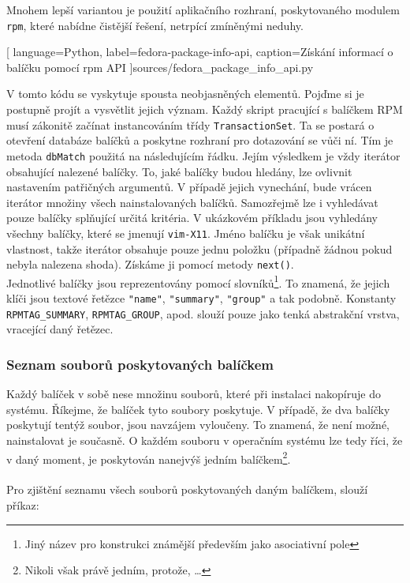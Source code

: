 \documentclass[
  field=inf,
  biblatex,
  glossaries,
  index
]{kidiplom}
\begin{document}
		Mnohem lepší variantou je použití aplikačního rozhraní, poskytovaného modulem \texttt{rpm}, které nabídne čistější řešení, netrpící zmíněnými neduhy.

		
		[
			language=Python,
			label=fedora-package-info-api,
			caption={Získání informací o balíčku pomocí rpm API}
		]{sources/fedora_package_info_api.py}

		V tomto kódu se vyskytuje spousta neobjasněných elementů. Pojďme si je postupně projít a vysvětlit jejich význam. Každý skript pracující s balíčkem RPM musí zákonitě začínat instancováním třídy \texttt{TransactionSet}. Ta se postará o otevření databáze balíčků a poskytne rozhraní pro dotazování se vůči ní. Tím je metoda \texttt{dbMatch} použitá na následujícím řádku. Jejím výsledkem je vždy iterátor obsahující nalezené balíčky. To, jaké balíčky budou hledány, lze ovlivnit nastavením patřičných argumentů. V případě jejich vynechání, bude vrácen iterátor množiny všech nainstalovaných balíčků. Samozřejmě lze i vyhledávat pouze balíčky splňující určitá kritéria. V ukázkovém příkladu jsou vyhledány všechny balíčky, které se jmenují \texttt{vim-X11}. Jméno balíčku je však unikátní vlastnost, takže iterátor obsahuje pouze jednu položku (případně žádnou pokud nebyla nalezena shoda). Získáme ji pomocí metody \texttt{next()}.
		\\
		Jednotlivé balíčky jsou reprezentovány pomocí slovníků\footnote{Jiný název pro konstrukci známější především jako asociativní pole}. To znamená, že jejich klíči jsou textové řetězce \texttt{"name"}, \texttt{"summary"}, \texttt{"group"} a tak podobně. Konstanty \texttt{RPMTAG\_SUMMARY}, \texttt{RPMTAG\_GROUP}, apod. slouží pouze jako tenká abstrakční vrstva, vracející daný řetězec.

		\subsubsection{Seznam souborů poskytovaných balíčkem}
		Každý balíček v sobě nese množinu souborů, které při instalaci nakopíruje do systému. Říkejme, že balíček tyto soubory poskytuje. V případě, že dva balíčky poskytují tentýž soubor, jsou navzájem vyloučeny. To znamená, že není možné, nainstalovat je současně. O každém souboru v operačním systému lze tedy říci, že v daný moment, je poskytován nanejvýš jedním balíčkem\footnote{Nikoli však právě jedním, protože, \dots}.
		\\
		\\
		Pro zjištění seznamu všech souborů poskytovaných daným balíčkem, slouží příkaz:
\end{document}
